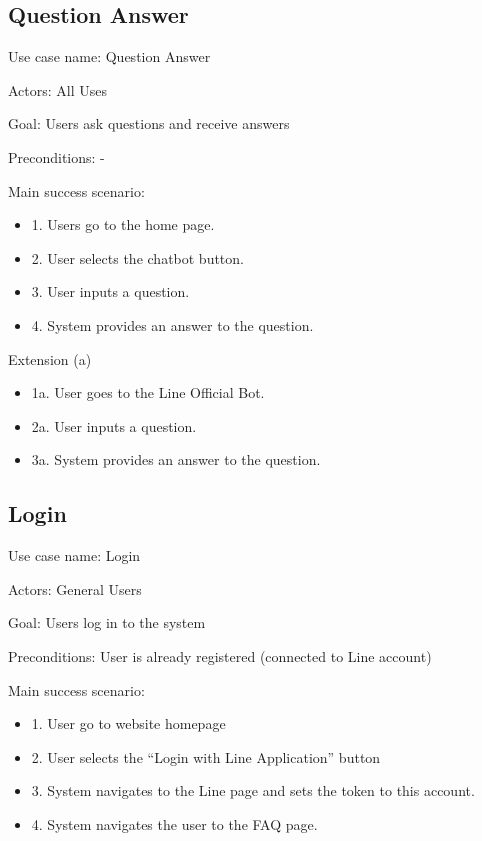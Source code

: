 \documentclass[12pt,oneside,openright,a4paper]{cpe-english-project}
\begin{document}
    \subsection{Question Answer}
      \qquad Use case name: Question Answer \par
      \qquad Actors: All Uses \par
      \qquad Goal: Users ask questions and receive answers \par
      \qquad Preconditions: - \par
      \qquad Main success scenario:
      \begin{itemize}
        \item[] 1. Users go to the home page.
        \item[] 2. User selects the chatbot button.
        \item[] 3. User inputs a question.
        \item[] 4. System provides an answer to the question.
      \end{itemize}
      \qquad Extension (a)
      \begin{itemize}
        \item[] 1a. User goes to the Line Official Bot.
        \item[] 2a. User inputs a question.
        \item[] 3a. System provides an answer to the question.
      \end{itemize}

    \subsection{Login}
      \qquad Use case name: Login \par
      \qquad Actors: General Users \par
      \qquad Goal: Users log in to the system \par
      \qquad Preconditions: User is already registered (connected to Line account) \par
      \qquad Main success scenario:
      \begin{itemize}
        \item[] 1. User go to website homepage
        \item[] 2. User selects the “Login with Line Application” button
        \item[] 3. System navigates to the Line page and sets the token to this account.
        \item[] 4. System navigates the user to the FAQ page.
      \end{itemize}
\end{document}
